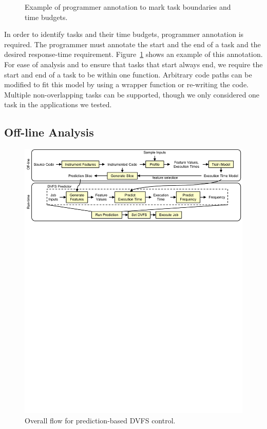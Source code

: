 \begin{figure}
\begin{center}
    \caption{Example of programmer annotation to mark task boundaries and time
    budgets.}
    \label{fig:exec_time_prediction.system.programmer_annotation}
  \end{center}
\end{figure}

In order to identify tasks and their time budgets, programmer annotation is
required. The programmer must annotate the start and the end of a task and the
desired response-time requirement.
Figure~\ref{fig:exec_time_prediction.system.programmer_annotation} shows an
example of this annotation.  For ease of analysis and to ensure that tasks that
start always end, we require the start and end of a task to be within one
function.  Arbitrary code paths can be modified to fit this model by using a
wrapper function or re-writing the code. Multiple non-overlapping tasks can be
supported, though we only considered one task in the applications we tested.

\subsection{Off-line Analysis}

\begin{figure}
  \begin{center}
    \includegraphics{exec_time_prediction/figs/high_level_flow.pdf}
    \caption{Overall flow for prediction-based DVFS control.}
    \label{fig:exec_time_prediction.system.high_level_flow}
  \end{center}
\end{figure}

